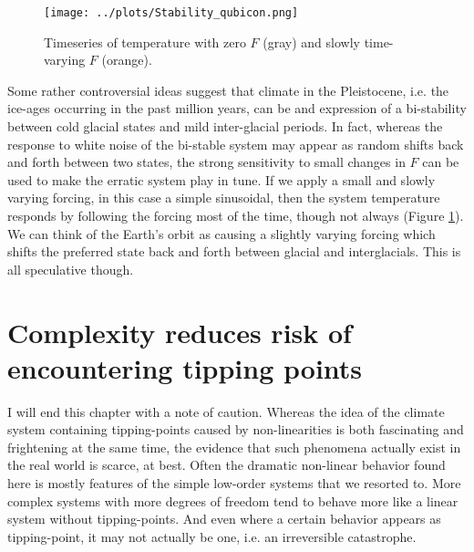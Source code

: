 \documentclass[12pt]{book}
\begin{document}
\begin{figure}
	\begin{center}
		\texttt{[image: ../plots/Stability\_qubicon.png]}
	\end{center}
	\caption{ Timeseries of temperature with zero $F$ (gray) and slowly time-varying $F$ (orange). } 
	\label{fig:bi-stable_timeseries}
\end{figure}

Some rather controversial ideas suggest that climate in the Pleistocene, i.e. the ice-ages occurring in the past million years, can be and expression of a bi-stability between cold glacial states and mild inter-glacial periods. 
In fact, whereas the response to white noise of the bi-stable system may appear as random shifts back and forth between two states, the strong sensitivity to small changes in $F$ can be used to make the erratic system play in tune. If we apply a small and slowly varying forcing, in this case a simple sinusoidal, then the system temperature responds by following the forcing most of the time, though not always (Figure \ref{fig:bi-stable_timeseries}). We can think of the Earth's orbit as causing a slightly varying forcing which shifts the preferred state back and forth between glacial and interglacials. This is all speculative though.
\\

\section{Complexity reduces risk of encountering tipping points}
I will end this chapter with a note of caution. Whereas the idea of the climate system containing tipping-points caused by non-linearities is both fascinating and frightening at the same time, the evidence that such phenomena actually exist in the real world is scarce, at best. Often the dramatic non-linear behavior found here is mostly features of the simple low-order systems that we resorted to. More complex systems with more degrees of freedom tend to behave more like a linear system without tipping-points. And even where a certain behavior appears as tipping-point, it may not actually be one, i.e. an irreversible catastrophe. 


\end{document}
